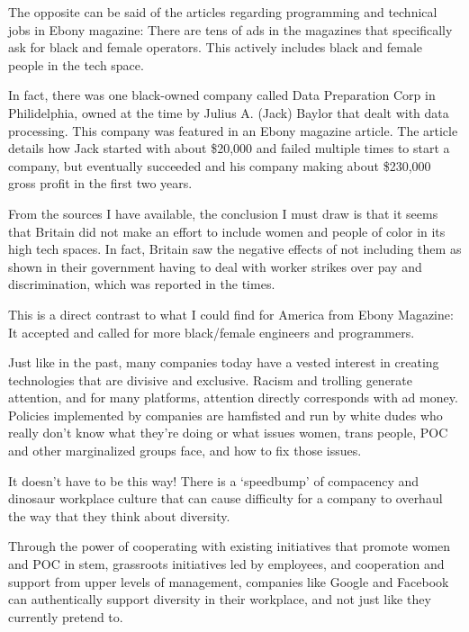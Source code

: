 \documentclass[a4paper,12pt]{article}
\begin{document}
The opposite can be said of the articles regarding programming and technical jobs in Ebony magazine: There are tens of ads in the magazines that specifically ask for black and female operators. This actively includes black and female people in the tech space.

In fact, there was one black-owned company called Data Preparation Corp in Philidelphia, owned at the time by Julius A. (Jack) Baylor that dealt with data processing. This company was featured in an Ebony magazine article. The article details how Jack started with about \$20,000 and failed multiple times to start a company, but eventually succeeded and his company making about \$230,000 gross profit in the first two years.

From the sources I have available, the conclusion I must draw is that it seems that Britain did not make an effort to include women and people of color in its high tech spaces. In fact, Britain saw the negative effects of not including them as shown in their government having to deal with worker strikes over pay and discrimination, which was reported in the times. 

This is a direct contrast to what I could find for America from Ebony Magazine: It accepted and called for more black/female engineers and programmers.


Just like in the past, many companies today have a vested interest in creating technologies that are divisive and exclusive. Racism and trolling generate attention, and for many platforms, attention directly corresponds with ad money. Policies implemented by companies are hamfisted and run by white dudes who really don't know what they're doing or what issues women, trans people, POC and other marginalized groups face, and how to fix those issues.

It doesn't have to be this way! There is a `speedbump' of compacency and dinosaur workplace culture that can cause difficulty for a company to overhaul the way that they think about diversity.

Through the power of cooperating with existing initiatives that promote women and POC in stem, grassroots initiatives led by employees, and cooperation and support from upper levels of management, companies like Google and Facebook can authentically support diversity in their workplace, and not just like they currently pretend to.
\end{document}
